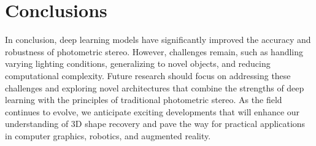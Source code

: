 \section{Conclusions}
In conclusion, deep learning models have significantly improved the accuracy and robustness of photometric stereo. However, challenges remain, such as handling varying lighting conditions, generalizing to novel objects, and reducing computational complexity. Future research should focus on addressing these challenges and exploring novel architectures that combine the strengths of deep learning with the principles of traditional photometric stereo. As the field continues to evolve, we anticipate exciting developments that will enhance our understanding of 3D shape recovery and pave the way for practical applications in computer graphics, robotics, and augmented reality.
